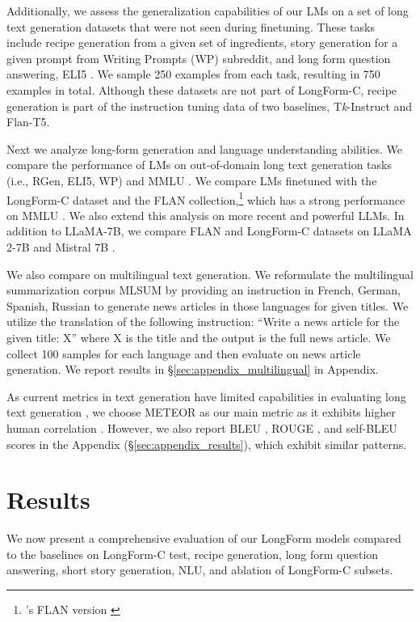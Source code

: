 	Additionally, we assess the generalization capabilities of our LMs on a set of long text generation datasets that were not seen during finetuning. These tasks include recipe generation \cite{bien-etal-2020-recipenlg} from a given set of ingredients, story generation for a given prompt from Writing Prompts (WP) subreddit, and long form question answering, ELI5 \cite{fan-etal-2019-eli5}. We sample 250 examples from each task, resulting in 750 examples in total. Although these datasets are not part of LongForm-C, recipe generation is part of the instruction tuning data of two baselines, T\textit{k}-Instruct and Flan-T5.

	Next we analyze  long-form generation and language understanding abilities. We compare the performance of LMs on out-of-domain long text generation tasks (i.e., RGen, ELI5, WP) and MMLU \cite{hendryckstest2021}. We compare LMs finetuned with the LongForm-C dataset and the FLAN collection,\footnote{\citet{wang2023far}'s
	 FLAN version  \cite{longpre2023flancollection}} which has a strong performance on MMLU \cite{chung2022scaling}. We also extend this analysis on more recent and powerful LLMs. In addition to LLaMA-7B, we compare FLAN and LongForm-C datasets on LLaMA 2-7B \citep{touvron2023llama2} and Mistral 7B \citep{jiang2023mistral}.

	We also compare on multilingual text generation. We reformulate the multilingual summarization corpus MLSUM \cite{scialom-etal-2020-mlsum} by providing an instruction in French, German, Spanish,  Russian to generate news articles in those languages for given titles. We utilize the translation of the following instruction: ``Write a news article for the given title: X'' where X is the title and the output is the full news article. We collect 100 samples for each language and then evaluate on news article generation. We report results in
	\S\ref{sec:appendix_multilingual} in Appendix.

	As current metrics in text generation have limited capabilities in evaluating long text generation \cite{celikyilmaz2020evaluation}, we choose METEOR \cite{banerjee-lavie-2005-meteor} as our main metric as it exhibits higher human correlation \cite{sharma2017relevance,
	chen-etal-2022-mtg}. However, we also report BLEU \cite{papineni-etal-2002-bleu}, ROUGE \cite{lin-2004-rouge}, and self-BLEU \cite{self-bleu} scores in the Appendix (\S\ref{sec:appendix_results}), which exhibit similar patterns.

	\section{Results}
We now present a comprehensive evaluation of our LongForm models compared to the baselines on LongForm-C test, recipe generation, long form question answering, short story generation, NLU, and ablation of LongForm-C subsets.
